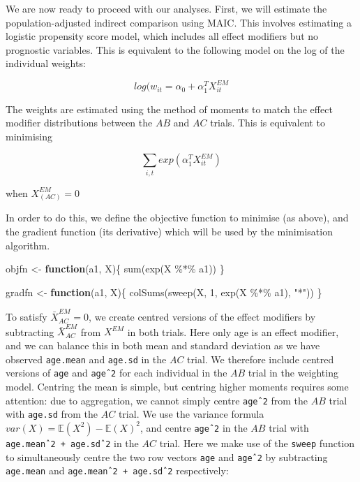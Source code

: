 \documentclass[
]{article}
\newenvironment{Shaded}{\begin{snugshade}}{\end{snugshade}}
\newcommand{\ControlFlowTok}[1]{\textcolor[rgb]{0.13,0.29,0.53}{\textbf{#1}}}
\newcommand{\DecValTok}[1]{\textcolor[rgb]{0.00,0.00,0.81}{#1}}
\newcommand{\FunctionTok}[1]{\textcolor[rgb]{0.00,0.00,0.00}{#1}}
\newcommand{\NormalTok}[1]{#1}
\newcommand{\OtherTok}[1]{\textcolor[rgb]{0.56,0.35,0.01}{#1}}
\newcommand{\SpecialCharTok}[1]{\textcolor[rgb]{0.00,0.00,0.00}{#1}}
\newcommand{\StringTok}[1]{\textcolor[rgb]{0.31,0.60,0.02}{#1}}
\begin{document}
We are now ready to proceed with our analyses. First, we will estimate
the population-adjusted indirect comparison using MAIC. This involves
estimating a logistic propensity score model, which includes all effect
modifiers but no prognostic variables. This is equivalent to the
following model on the log of the individual weights:

\[log(w_{it}=\alpha_{0}+\alpha_{1}^TX_{it}^{EM}\]

The weights are estimated using the method of moments to match the
effect modifier distributions between the \(AB\) and \(AC\) trials. This
is equivalent to minimising

\[\sum_{i,t}exp(\alpha_{1}^TX_{it}^{EM})\]

when \(X_{(AC)}^{EM}=0\)

In order to do this, we define the objective function to minimise (as
above), and the gradient function (its derivative) which will be used by
the minimisation algorithm.

\begin{Shaded}
\begin{Highlighting}[]
\NormalTok{objfn }\OtherTok{\textless{}{-}} \ControlFlowTok{function}\NormalTok{(a1, X)\{}
  \FunctionTok{sum}\NormalTok{(}\FunctionTok{exp}\NormalTok{(X }\SpecialCharTok{\%*\%}\NormalTok{ a1))}
\NormalTok{\}}

\NormalTok{gradfn }\OtherTok{\textless{}{-}} \ControlFlowTok{function}\NormalTok{(a1, X)\{}
  \FunctionTok{colSums}\NormalTok{(}\FunctionTok{sweep}\NormalTok{(X, }\DecValTok{1}\NormalTok{, }\FunctionTok{exp}\NormalTok{(X }\SpecialCharTok{\%*\%}\NormalTok{ a1), }\StringTok{"*"}\NormalTok{))}
\NormalTok{\}}
\end{Highlighting}
\end{Shaded}

To satisfy \(\bar{X}_{AC}^{EM}=0\), we create centred versions of the
effect modifiers by subtracting \(\bar{X}_{AC}^{EM}\) from \(X^{EM}\) in
both trials. Here only age is an effect modifier, and we can balance
this in both mean and standard deviation as we have observed
\texttt{age.mean} and \texttt{age.sd} in the \(AC\) trial. We therefore
include centred versions of \texttt{age} and \texttt{ageˆ2} for each
individual in the \(AB\) trial in the weighting model. Centring the mean
is simple, but centring higher moments requires some attention: due to
aggregation, we cannot simply centre \texttt{ageˆ2} from the \(AB\)
trial with \texttt{age.sd} from the \(AC\) trial. We use the variance
formula \(var(X)=\mathbb{E}(X^2)-\mathbb{E}(X)^2\), and centre
\texttt{ageˆ2} in the \(AB\) trial with \texttt{age.meanˆ2\ +\ age.sdˆ2}
in the \(AC\) trial. Here we make use of the \texttt{sweep} function to
simultaneously centre the two row vectors \texttt{age} and
\texttt{ageˆ2} by subtracting \texttt{age.mean} and
\texttt{age.meanˆ2\ +\ age.sdˆ2} respectively:
\end{document}
